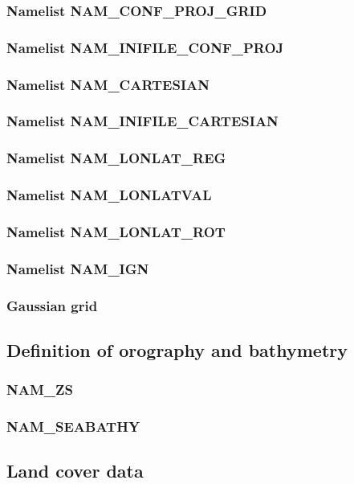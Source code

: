 \subsubsection{Namelist NAM\_CONF\_PROJ\_GRID}
\subsubsection{Namelist NAM\_INIFILE\_CONF\_PROJ}
\subsubsection{Namelist NAM\_CARTESIAN}
\subsubsection{Namelist NAM\_INIFILE\_CARTESIAN}
\subsubsection{Namelist NAM\_LONLAT\_REG}
\subsubsection{Namelist NAM\_LONLATVAL}
\subsubsection{Namelist NAM\_LONLAT\_ROT}
\subsubsection{Namelist NAM\_IGN}
\subsubsection{Gaussian grid}

\newpage
\subsection{Definition of orography and bathymetry}
\subsubsection{NAM\_ZS}
\subsubsection{NAM\_SEABATHY}

\newpage
\subsection{Land cover data}
